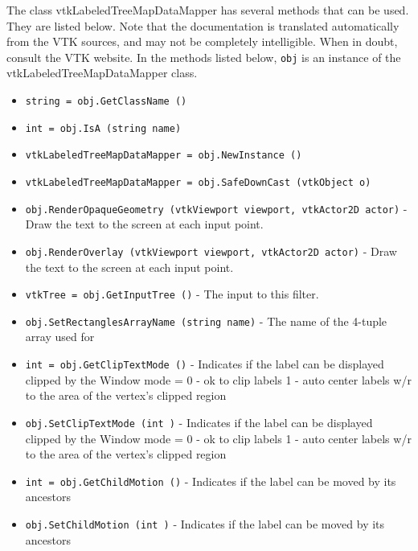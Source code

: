 The class vtkLabeledTreeMapDataMapper has several methods that can be used.
  They are listed below.
Note that the documentation is translated automatically from the VTK sources,
and may not be completely intelligible.  When in doubt, consult the VTK website.
In the methods listed below, \verb|obj| is an instance of the vtkLabeledTreeMapDataMapper class.
\begin{itemize}
\item  \verb|string = obj.GetClassName ()|

\item  \verb|int = obj.IsA (string name)|

\item  \verb|vtkLabeledTreeMapDataMapper = obj.NewInstance ()|

\item  \verb|vtkLabeledTreeMapDataMapper = obj.SafeDownCast (vtkObject o)|

\item  \verb|obj.RenderOpaqueGeometry (vtkViewport viewport, vtkActor2D actor)| -  Draw the text to the screen at each input point.

\item  \verb|obj.RenderOverlay (vtkViewport viewport, vtkActor2D actor)| -  Draw the text to the screen at each input point.

\item  \verb|vtkTree = obj.GetInputTree ()| -  The input to this filter.

\item  \verb|obj.SetRectanglesArrayName (string name)| -  The name of the 4-tuple array used for

\item  \verb|int = obj.GetClipTextMode ()| -  Indicates if the label can be displayed clipped by the Window
 mode = 0 - ok to clip labels
 1 - auto center labels w/r to the area of the vertex's clipped region

\item  \verb|obj.SetClipTextMode (int )| -  Indicates if the label can be displayed clipped by the Window
 mode = 0 - ok to clip labels
 1 - auto center labels w/r to the area of the vertex's clipped region

\item  \verb|int = obj.GetChildMotion ()| -  Indicates if the label can be moved by its ancestors

\item  \verb|obj.SetChildMotion (int )| -  Indicates if the label can be moved by its ancestors


\end{itemize}

